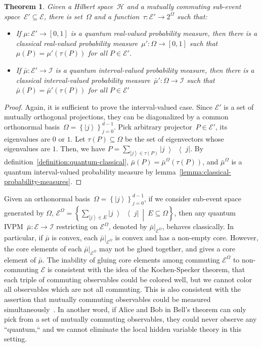 \documentclass[12pt]{iopart}
\theoremstyle{plain}
\newtheorem{thm}{Theorem}
\theoremstyle{definition}
\newcommand{\Hilb}{\mathcal{H}}
\newcommand{\events}{\ensuremath{\mathcal{E}}}
\newcommand{\ket}[1]{{\left\vert{#1}\right\rangle}}
\newcommand{\op}[2]{\ensuremath{\left\vert{#1}\middle\rangle\middle\langle{#2}\right\vert}}
\newcommand{\proj}[1]{\op{#1}{#1}}
\newcommand{\set}[2]{\ensuremath{\left\{ {#1}~\middle|~{#2}\right\} }}
\begin{document}
\begin{thm}\label{thm:sub-event-space}Given a Hilbert space~$\Hilb$
and a mutually commuting sub-event space~$\events'\subseteq\events$,
there is set~$\Omega$ and a function~$\tau:\events'\rightarrow2^{\Omega}$
such that:
\begin{itemize}
\item If $\mu:\events'\rightarrow\left[0,1\right]$ is a quantum real-valued
probability measure, then there is a classical real-valued probability
measure~$\mu':\Omega\rightarrow\left[0,1\right]$ such that $\mu\left(P\right)=\mu'\left(\tau\left(P\right)\right)$
for all $P\in\events'$.
\item If $\bar{\mu}:\events'\rightarrow\mathscr{I}$ is a quantum interval-valued
probability measure, then there is a classical interval-valued probability
measure~$\bar{\mu}':\Omega\rightarrow\mathscr{I}$ such that $\bar{\mu}\left(P\right)=\bar{\mu}'\left(\tau\left(P\right)\right)$
for all $P\in\events'$
\end{itemize}
\end{thm}

\begin{proof}Again, it is sufficient to prove the interval-valued
case. Since $\events'$ is a set of mutually orthogonal projections,
they can be diagonalized by a common orthonormal basis~$\Omega=\left\{ \ket{j}\right\} _{j=0}^{d-1}$.
Pick arbitrary projector~$P\in\events'$, its eigenvalues are $0$
or $1$. Let $\tau\left(P\right)\subseteq\Omega$ be the set of eigenvectors
whose eigenvalues are $1$. Then, we have $P=\sum_{\ket{j}\in\tau\left(P\right)}\proj{j}$.
By definition~\ref{definition:quantum-classical}, $\bar{\mu}\left(P\right)=\bar{\mu}^{\Omega}\left(\tau\left(P\right)\right)$,
and $\bar{\mu}^{\Omega}$ is a quantum interval-valued probability
measure by lemma~\ref{lemma:classical-probability-measures}.\end{proof}

Given an orthonormal basis~$\Omega=\left\{ \ket{j}\right\} _{j=0}^{d-1}$,
if we consider sub-event space generated by $\Omega$, $\events^{\Omega}=\set{\sum_{\ket{j}\in E}\proj{j}}{E\subseteq\Omega}$,
then any quantum IVPM~$\bar{\mu}:\events\rightarrow\mathscr{I}$
restricting on $\events^{\Omega}$, denoted by $\bar{\mu}|_{\events^{\Omega}}$,
behaves classically. In particular, if $\bar{\mu}$ is convex, each
$\bar{\mu}|_{\events^{\Omega}}$ is convex and has a non-empty core.
However, the core elements of each $\bar{\mu}|_{\events^{\Omega}}$
may not be glued together, and gives a core element of $\bar{\mu}$.
The inability of gluing core elements among commuting $\events^{\Omega}$
to non-commuting $\events$ is consistent with the idea of the Kochen-Specker
theorem, that each triple of commuting observables could be colored
well, but we cannot color all observables which are not all commuting.
This is also consistent with the assertion that mutually commuting
observables could be measured simultaneously~\cite{Mermin_1993}.
In another word, if Alice and Bob in Bell's theorem can only pick
from a set of mutually commuting observables, they could never observe
any ``quantum,`` and we cannot eliminate the local hidden variable
theory in this setting.
\end{document}
